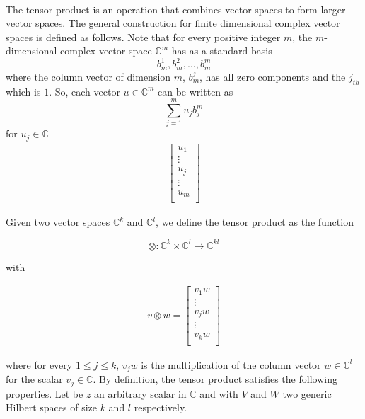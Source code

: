 \documentclass[a4paper,10pt]{article}
\begin{document}
\paragraph{} The tensor product is an operation that combines vector spaces to form larger vector spaces. The general construction for finite dimensional complex vector spaces is defined as follows. Note that for every positive integer $m$, the $m$-dimensional complex vector space ${\mathbb{C}}^m$ has as a standard basis
$$b_m^1, b_m^2, \ldots, b_m^m$$
where the column vector of dimension $m$, $b_m^j$, has all zero components and the $j_{th}$ which is $1$. So, each vector $u \in {\mathbb{C}}^m$ can be written as
$$\sum\limits_{j=1}^m{u_{j}b_{j}^m}$$
for $u_j \in \mathbb{C}$
\begin{equation*}
\begin{aligned}
{\begin{bmatrix}
u_1 \\
\vdots \\
u_j \\
\vdots \\
u_m \\
\end{bmatrix}}
\end{aligned}
\end{equation*}

Given two vector spaces ${\mathbb{C}}^k$ and ${\mathbb{C}}^l$, we define the tensor product as the function

$$\otimes: {\mathbb{C}}^k \times {\mathbb{C}}^l \xrightarrow{} {\mathbb{C}}^{kl}$$

with

\begin{equation*}
\begin{aligned}
v \otimes w = {\begin{bmatrix}
v_1w \\
\vdots \\
v_jw \\
\vdots \\
v_kw \\
\end{bmatrix}}
\end{aligned}
\end{equation*}

where for every $1 \leq j \leq k$, $v_jw$ is the multiplication of the column vector $w \in {\mathbb{C}}^l$ for the scalar $v_j \in \mathbb{C}$. By definition, the tensor product satisfies the following properties. Let be $z$ an arbitrary scalar in $\mathbb{C}$ and with $V$ and $W$ two generic Hilbert spaces of size $k$ and $l$ respectively.
\end{document}
